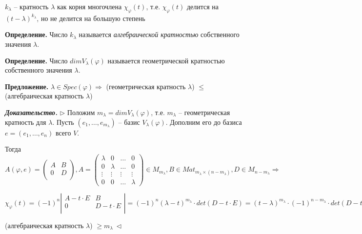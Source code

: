 $k_\lambda$ -- кратность $\lambda$ как корня многочлена $\chi_{\varphi} (t)$, т.е. $\chi_{\varphi} (t)$ делится на $(t - \lambda)^{k_{\lambda}}$, но не делится на большую степень

\bigskip
\textbf{Определение.} Число $k_{\lambda}$ называется \textit{алгебраической кратностью} собственного значения $\lambda$.

\bigskip
\textbf{Определение.} Число $dim V_{\lambda} (\varphi)$ называется $\textit{геометрической кратностью}$ собственного значения $\lambda$.

\bigskip
\textbf{Предложение.} $\lambda \in Spec(\varphi) \Rightarrow$ (геометрическая кратность $\lambda$) $\leq$ (алгебраическая кратность $\lambda$)

\bigskip
\textbf{\textit{Доказательство.}} $\rhd$ Положим $m_{\lambda} = dim V_{\lambda} (\varphi)$, т.е. $m_{\lambda}$ -- геометрическая кратность для $\lambda$. Пусть $(e_1, \dots, e_{m_\lambda})$ -- базис $V_{\lambda} (\varphi)$. Дополним его до базиса $e = (e_1, \dots, e_n)$ всего $V$.

Тогда $A(\varphi, e) = \left( \begin{array}{c|c}
  A & B  \\
  \hline
  0 & D  \\
\end{array}
\right), A = \begin{pmatrix} \lambda & 0 & \dots & 0 \\ 0 & \lambda & \dots & 0 \\ \vdots & \vdots & \vdots & \vdots \\ 0 & 0 & \dots & \lambda \end{pmatrix} \in M_{m_{\lambda}}, B \in Mat_{m_{\lambda} \times (n - m_{\lambda})}, D \in M_{n - m_{\lambda}} \Rightarrow$

$\chi_{\varphi}(t) = (-1)^n \left| \begin{array}{c|c}
  A - t \cdot E & B  \\
  \hline
  0 & D - t \cdot E  \\
\end{array}
\right|  = (-1)^n (\lambda - t)^{m_\lambda} \cdot det (D - t \cdot E) = (t - \lambda)^{m_\lambda} \cdot (-1)^{n - m_{\lambda}} \cdot det (D - t \cdot E) \Rightarrow \chi_{\varphi} (t) \vdots (t - \lambda)^{m_{\lambda}} \Rightarrow$

(алгебраическая кратность $\lambda$) $\geq m_{\lambda} \ \lhd$

